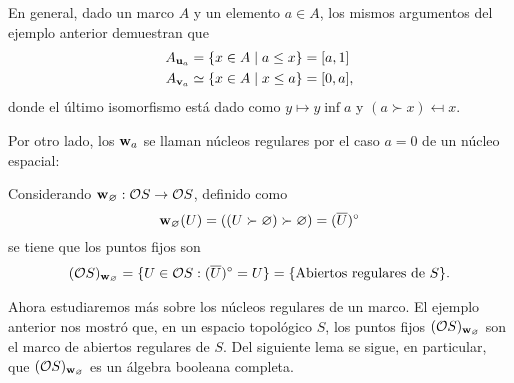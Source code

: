\begin{exa}
En general, dado un marco $A$ y un elemento $a\in A$,
los mismos argumentos del ejemplo anterior demuestran que
\begin{align*}
    A_{\mathbf u_{a}}
    &= \{x\in A\mid a\leq x\} = [a,1]\\
    A_{\mathbf v_{a}}
    &\simeq \{x\in A\mid x\leq a\} = [0,a],
\end{align*}
donde el último isomorfismo está dado como $y\mapsto y\inf a$
y $(a\succ x)\mapsfrom x$.
\end{exa}

Por otro lado, los $\mathbf w_{a}$ se llaman núcleos regulares por el
caso $a=0$ de un núcleo espacial:

\begin{exa}
  Considerando $\mathbf w_{\varnothing}:\mathcal{O} S\to \mathcal{O} S$, definido
  como
  \[
    \mathbf w_{\varnothing}(U)
    =((U\succ\varnothing)\succ\varnothing)
    =(\overline{U})^{\circ}
  \]
  se tiene que los puntos fijos son 
  $$(\mathcal{O}S)_{\mathbf w_{\varnothing}}
  =\{U\in \mathcal{O} S : (\overline{U})^{\circ}=U\}
  =\{\text{Abiertos regulares de }S\}.$$
\end{exa}

Ahora estudiaremos más sobre los núcleos regulares de un marco.
El ejemplo anterior nos mostró que, en un espacio topológico $S$,
los puntos fijos $(\mathcal{O}S)_{\mathbf w_{\varnothing}}$ son el marco de
abiertos regulares de $S$.
Del siguiente lema se sigue, en particular, que
$(\mathcal{O}S)_{\mathbf w_{\varnothing}}$ es un álgebra booleana completa.

